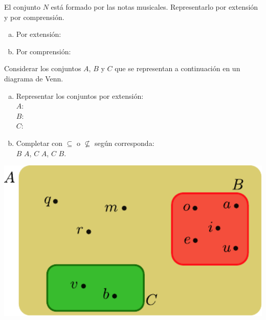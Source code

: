 \documentclass[11pt]{article}
\begin{document}
\begin{exercise}
El conjunto $N$ está formado por las notas musicales. Representarlo por extensión y por comprensión.
\begin{enumerate}[a)]
    \item Por extensión: \blank[width=10cm]{}
    \item Por comprensión: \blank[width=10cm]{}
\end{enumerate}
\end{exercise}

\begin{exercise}
Considerar los conjuntos $A$, $B$ y $C$ que se representan a continuación en un diagrama de Venn. 
\begin{minipage}{0.45\textwidth}
\begin{enumerate}[a)]
    \item Representar los conjuntos por extensión:\\[0.5em]
        $A$: \blank[width=4cm]{} \\[0.5em]
        $B$: \blank[width=4cm]{} \\[0.5em]
        $C$: \blank[width=4cm]{} 
    \item Completar con $\subseteq$ o $\nsubseteq$ según corresponda: \\[0.5em]
        $B$ \blank{} $A$, $C$ \blank{} $A$, $C$ \blank{} $B$.
\end{enumerate}

\end{minipage}
\hfill
\begin{minipage}{0.45\textwidth}
    \begin{center}
        \includegraphics[width=1.0\textwidth]{figs/ej-01.pdf}
    \end{center}
\end{minipage}
\end{exercise}
\end{document}
